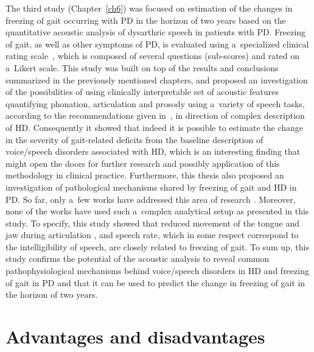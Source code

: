 The third study (Chapter~\ref{ch6}) was focused on estimation of the changes in freezing of gait occurring with PD in the horizon of two years based on the quantitative acoustic analysis of dysarthric speech in patients with PD. Freezing of gait, as well as other symptoms of PD, is evaluated using a~specialized clinical rating scale~\cite{Giladi2000}, which is composed of several questions (sub-scores) and rated on a~Likert scale. This study was built on top of the results and conclusions summarized in the previously mentioned chapters, and proposed an investigation of the possibilities of using clinically interpretable set of acoustic features quantifying phonation, articulation and prosody using a~variety of speech tasks, according to the recommendations given in~\cite{Brabenec2017}, in direction of complex description of HD. Consequently it showed that indeed it is possible to estimate the change in the severity of gait-related deficits from the baseline description of voice/speech disorders associated with HD, which is an interesting finding that might open the doors for further research and possibly application of this methodology in clinical practice. Furthermore, this thesis also proposed an investigation of pathological mechanisms shared by freezing of gait and HD in PD. So far, only a~few works have addressed this area of research \cite{Giladi2001b, Bartels2003, Moreau2007, Cantiniaux2010, Park2014}. Moreover, none of the works have used such a~complex analytical setup as presented in this study. To specify, this study showed that reduced movement of the tongue and jaw during articulation \cite{Gomez2017, Gomez2017b, Vergara2017}, and speech rate, which in some respect correspond to the intelligibility of speech, are closely related to freezing of gait. To sum up, this study confirms the potential of the acoustic analysis to reveal common pathophysiological mechanisms behind voice/speech disorders in HD and freezing of gait in PD and that it can be used to predict the change in freezing of gait in the horizon of two years.

\section{Advantages and disadvantages}
\label{ch7_2}

